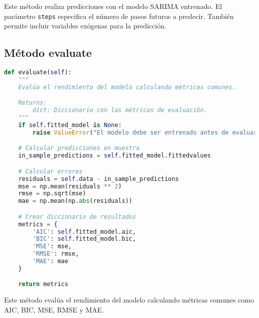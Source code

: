 \documentclass[12pt,letterpaper]{report}
\begin{document}
Este método realiza predicciones con el modelo SARIMA entrenado. El parámetro \texttt{steps} especifica el número de pasos futuros a predecir. También permite incluir variables exógenas para la predicción.

\subsection{Método evaluate}
\begin{lstlisting}[language=python]
def evaluate(self):
    """
    Evalúa el rendimiento del modelo calculando métricas comunes.

    Returns:
        dict: Diccionario con las métricas de evaluación.
    """
    if self.fitted_model is None:
        raise ValueError("El modelo debe ser entrenado antes de evaluarlo")

    # Calcular predicciones en muestra
    in_sample_predictions = self.fitted_model.fittedvalues

    # Calcular errores
    residuals = self.data - in_sample_predictions
    mse = np.mean(residuals ** 2)
    rmse = np.sqrt(mse)
    mae = np.mean(np.abs(residuals))

    # Crear diccionario de resultados
    metrics = {
        'AIC': self.fitted_model.aic,
        'BIC': self.fitted_model.bic,
        'MSE': mse,
        'RMSE': rmse,
        'MAE': mae
    }

    return metrics
\end{lstlisting}

Este método evalúa el rendimiento del modelo calculando métricas comunes como AIC, BIC, MSE, RMSE y MAE.
\end{document}
